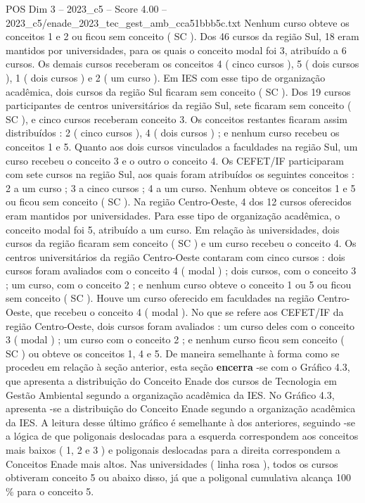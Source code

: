 \begin{textsample}{POS Dim 3 – 2023\_c5 – Score 4.00 – 2023\_c5/enade\_2023\_tec\_gest\_amb\_cca51bbb5c.txt}
Nenhum curso obteve os conceitos 1 e 2 ou ficou sem conceito ( SC ).
Dos 46 cursos da região Sul, 18 eram mantidos por universidades, para os quais o conceito modal foi 3, atribuído a 6 cursos.
Os demais cursos receberam os conceitos 4 ( cinco cursos ), 5 ( dois cursos ), 1 ( dois cursos ) e 2 ( um curso ).
Em IES com esse tipo de organização acadêmica, dois cursos da região Sul ficaram sem conceito ( SC ).
Dos 19 cursos participantes de centros universitários da região Sul, sete ficaram sem conceito ( SC ), e cinco cursos receberam conceito 3.
Os conceitos restantes ficaram assim distribuídos : 2 ( cinco cursos ), 4 ( dois cursos ) ; e nenhum curso recebeu os conceitos 1 e 5.
Quanto aos dois cursos vinculados a faculdades na região Sul, um curso recebeu o conceito 3 e o outro o conceito 4.
Os CEFET/IF participaram com sete cursos na região Sul, aos quais foram atribuídos os seguintes conceitos : 2 a um curso ; 3 a cinco cursos ; 4 a um curso.
Nenhum obteve os conceitos 1 e 5 ou ficou sem conceito ( SC ).
Na região Centro-Oeste, 4 dos 12 cursos oferecidos eram mantidos por universidades.
Para esse tipo de organização acadêmica, o conceito modal foi 5, atribuído a um curso.
Em relação às universidades, dois cursos da região ficaram sem conceito ( SC ) e um curso recebeu o conceito 4.
Os centros universitários da região Centro-Oeste contaram com cinco cursos : dois cursos foram avaliados com o conceito 4 ( modal ) ; dois cursos, com o conceito 3 ; um curso, com o conceito 2 ; e nenhum curso obteve o conceito 1 ou 5 ou ficou sem conceito ( SC ).
Houve um curso oferecido em faculdades na região Centro-Oeste, que recebeu o conceito 4 ( modal ).
No que se refere aos CEFET/IF da região Centro-Oeste, dois cursos foram avaliados : um curso deles com o conceito 3 ( modal ) ; um curso com o conceito 2 ; e nenhum curso ficou sem conceito ( SC ) ou obteve os conceitos 1, 4 e 5.
De maneira semelhante à forma como se procedeu em relação à seção anterior, esta seção \textbf{encerra} -se com o Gráfico 4.3, que apresenta a distribuição do Conceito Enade dos cursos de Tecnologia em Gestão Ambiental segundo a organização acadêmica da IES.
No Gráfico 4.3, apresenta -se a distribuição do Conceito Enade segundo a organização acadêmica da IES.
A leitura desse último gráfico é semelhante à dos anteriores, seguindo -se a lógica de que poligonais deslocadas para a esquerda correspondem aos conceitos mais baixos ( 1, 2 e 3 ) e poligonais deslocadas para a direita correspondem a Conceitos Enade mais altos.
Nas universidades ( linha rosa ), todos os cursos obtiveram conceito 5 ou abaixo disso, já que a poligonal cumulativa alcança 100 \% para o conceito 5.

\end{textsample}
